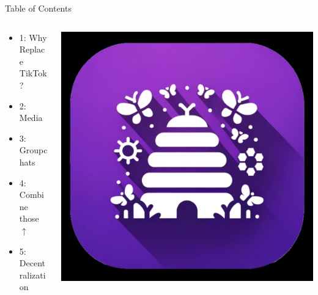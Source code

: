 \documentclass[aspectratio=169]{beamer}
\begin{document}
\begin{frame}{Table of Contents}

\begin{columns}[T]
    \begin{column}[T]{0.5\textwidth}
        \begin{itemize}
            \item 1: Why Replace TikTok?
            \item 2: Media
            \item 3: Groupchats 
            \item 4: Combine those $\uparrow$
            \item 5: Decentralization
        \end{itemize}
    \end{column}
    
    \begin{column}{0.5\textwidth}
        \includegraphics[height=0.8\textheight]{imgs/app_icons/2.png}
    \end{column}
\end{columns}

\end{frame}
\end{document}

